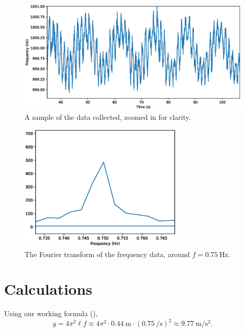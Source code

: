 \documentclass[11pt]{article}
\begin{document}
    \begin{figure}[H]
    \begin{center}
        \includegraphics[width=\textwidth]{./freq.eps}
    \end{center}
    \caption{A sample of the data collected, zoomed in for clarity.}
    \label{fig:freq}
    \end{figure}
    
    \begin{figure}[H]
    \begin{center}
        \includegraphics[width=0.7\textwidth]{./fourier.eps}
    \end{center}
    \caption{The Fourier transform of the frequency data, around $f =
    \SI{0.75}{\Hz}$.}
    \label{fig:fourier}
    \end{figure}

    \section{Calculations}
    Using our working formula (\star), \[
        g = 4\pi^2\ell f \approx 4\pi^2\cdot \SI{0.44}{\m}\cdot
        \left(\SI{0.75}{\per\s}\right)^2 \approx \SI{9.77}{\m\per\s^2}.
    \] 
\end{document}

